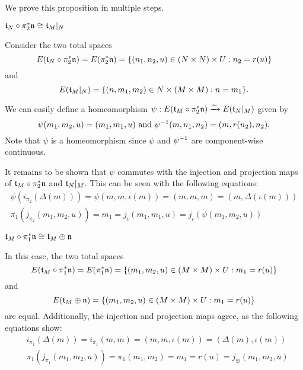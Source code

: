 \begin{myproof}
    We prove this proposition in multiple steps.
    \begin{steps}
        \item $\mathfrak{t}_N \circ \pi_2^*\mathfrak{n} \cong \mathfrak{t}_M\vert_{N}$
        
        Consider the two total spaces
        \[ E(\mathfrak{t}_N \circ \pi_2^*\mathfrak{n}) = E(\pi_2^*\mathfrak{n}) = \{(n_1, n_2, u) \in (N \times N) \times U:n_2 = r(u)\} \]
        and
        \[ E(\mathfrak{t}_M\vert_{N}) = \{(n, m_1, m_2) \in N \times (M \times M):n = m_1\}. \]

        We can easily define a homeomorphism $\psi: E(\mathfrak{t}_M \circ \pi_2^*\mathfrak{n}) \xrightarrow{\sim} E(\mathfrak{t}_N\vert_{M})$ given by
        \[ \psi(m_1, m_2, u) = (m_1, m_1, u) \text{ and } \psi^{-1}(m, n_1, n_2) = (m, r(n_2), n_2). \]
        Note that $\psi$ is a homeomorphism since $\psi$ and $\psi^{-1}$ are component-wise continuous.

        It remains to be shown that $\psi$
        commutes with the injection and projection maps of $\mathfrak{t}_M \circ \pi_2^*\mathfrak{n}$ and $\mathfrak{t}_N\vert_{M}$.
        This can be seen with the following equations:
        \begin{align}
            \psi(i_{\pi_2}(\Delta(m))) = \psi(m, m, \iota(m)) = (m, m, m) = (m, \Delta(\iota(m))) \\
            \pi_1(j_{\pi_2}(m_1, m_2, u)) = m_1 = j_\iota(m_1, m_1, u) = j_\iota(\psi(m_1, m_2, u)) 
        \end{align}
        
        \item $\mathfrak{t}_M \circ \pi_1^*\mathfrak{n} \cong \mathfrak{t}_M \oplus{} \mathfrak{n}$
        
        In this case, the two total spaces
        \[ E(\mathfrak{t}_M \circ \pi_1^*\mathfrak{n}) = E(\pi_1^*\mathfrak{n}) = \{(m_1, m_2, u) \in (M \times M) \times U:m_1 = r(u)\} \]
        and
        \[ E(\mathfrak{t}_M \oplus{} \mathfrak{n}) = \{(m_1, m_2, u) \in (M \times M) \times U:m_1 = r(u)\} \]
        are equal.
        Additionally,
        the injection and projection maps agree, as the following equations show:
        \begin{align}
            & i_{\pi_1}(\Delta(m)) = i_{\pi_1}(m, m) = (m, m, \iota(m)) = (\Delta(m), \iota(m)) \\
            & \pi_1(j_{\pi_1}(m_1, m_2, u)) = \pi_1(m_1, m_2) = m_1 = r(u) = j_{\oplus}(m_1, m_2, u)
        \end{align}


\end{steps}
\end{myproof}
